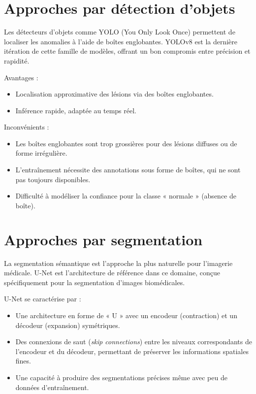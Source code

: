 \documentclass[12pt,a4paper,twoside]{report}
\begin{document}
\section{Approches par détection d'objets}

Les détecteurs d'objets comme YOLO (You Only Look Once) \cite{yolo} permettent de localiser les anomalies à l'aide de boîtes englobantes. YOLOv8 \cite{ultralytics} est la dernière itération de cette famille de modèles, offrant un bon compromis entre précision et rapidité.

Avantages :
\begin{itemize}
  \item Localisation approximative des lésions via des boîtes englobantes.
  \item Inférence rapide, adaptée au temps réel.
\end{itemize}

Inconvénients :
\begin{itemize}
  \item Les boîtes englobantes sont trop grossières pour des lésions diffuses ou de forme irrégulière.
  \item L'entraînement nécessite des annotations sous forme de boîtes, qui ne sont pas toujours disponibles.
  \item Difficulté à modéliser la confiance pour la classe « normale » (absence de boîte).
\end{itemize}

\section{Approches par segmentation}

La segmentation sémantique est l'approche la plus naturelle pour l'imagerie médicale. U-Net \cite{unet} est l'architecture de référence dans ce domaine, conçue spécifiquement pour la segmentation d'images biomédicales.

U-Net se caractérise par :
\begin{itemize}
  \item Une architecture en forme de « U » avec un encodeur (contraction) et un décodeur (expansion) symétriques.
  \item Des connexions de saut (\textit{skip connections}) entre les niveaux correspondants de l'encodeur et du décodeur, permettant de préserver les informations spatiales fines.
  \item Une capacité à produire des segmentations précises même avec peu de données d'entraînement.
\end{itemize}
\end{document}
